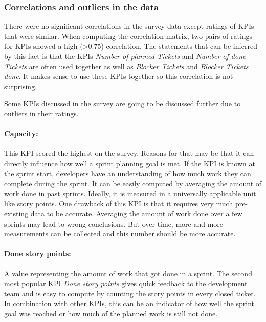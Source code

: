 \subsubsection{Correlations and outliers in the data}

There were no significant correlations in the survey data except ratings of KPIs that were similar. 
When computing the correlation matrix, 
two pairs of ratings for KPIs showed a high (>0.75) correlation. 
The statements that can be inferred by this fact is that the KPIs \textit{Number of planned Tickets} and \textit{Number of done Tickets} are often used together as well as \textit{Blocker Tickets} and \textit{Blocker Tickets done}. 
It makes sense to use these KPIs together so this correlation is not surprising.

Some KPIs discussed in the survey are going to be discussed further due to outliers in their ratings.

\paragraph{\textbf{Capacity}:} This KPI scored the highest on the survey. Reasons for that may be that it can directly influence how well a sprint planning goal is met. If the KPI is known at the sprint start, developers have an understanding of how much work they can complete during the sprint. It can be easily computed by averaging the amount of work done in past sprints. Ideally, it is measured in a universally applicable unit like story points. One drawback of this KPI is that it requires very much pre-existing data to be accurate. Averaging the amount of work done over a few sprints may lead to wrong conclusions. But over time, more and more measurements can be collected and this number should be more accurate.

\paragraph{\textbf{Done story points}:} A value representing the amount of work that got done in a sprint. The second most popular KPI \textit{Done story points} gives quick feedback to the development team and is easy to compute by counting the story points in every closed ticket. In combination with other KPIs, this can be an indicator of how well the sprint goal was reached or how much of the planned work is still not done. 

